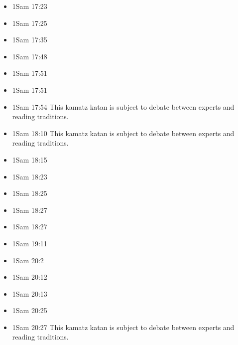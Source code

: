 \documentclass[14pt]{book}
\begin{document}
\begin{multicols}{2}
\begin{itemize}
							\item 1Sam 17:23
							
							\item 1Sam 17:25
							
							\item 1Sam 17:35
							
							\item 1Sam 17:48
							
							\item 1Sam 17:51
							
							\item 1Sam 17:51
							
							\item 1Sam 17:54 This kamatz katan is subject to debate between experts and reading traditions.
							
							\item 1Sam 18:10 This kamatz katan is subject to debate between experts and reading traditions.
							
							\item 1Sam 18:15
							
							\item 1Sam 18:23
							
							\item 1Sam 18:25
							
							\item 1Sam 18:27
							
							\item 1Sam 18:27
							
							\item 1Sam 19:11
							
							\item 1Sam 20:2
							
							\item 1Sam 20:12
							
							\item 1Sam 20:13
							
							\item 1Sam 20:25
							
							\item 1Sam 20:27 This kamatz katan is subject to debate between experts and reading traditions.
							

\end{itemize}
\end{multicols}
\end{document}
